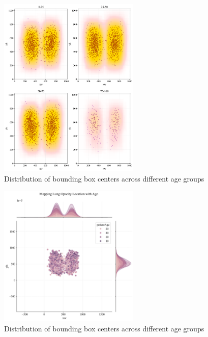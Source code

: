 \begin{figure}[H]
    \begin{center}
        \includegraphics[width = 0.6\textwidth]{figures/Figure14.png}
        \caption{Distribution of bounding box centers across different age groups}
        \label{fig:cha-2 figure9}
    \end{center}
\end{figure}

\begin{figure}[H]
    \begin{center}
        \includegraphics[width = 0.6\textwidth]{figures/Figure15.png}
        \caption{Distribution of bounding box centers across different age groups}
        \label{fig:cha-2 figure10}
    \end{center}
\end{figure}

